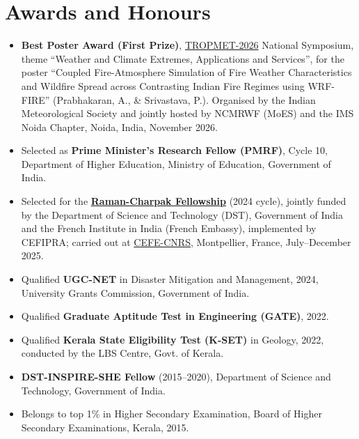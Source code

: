 \documentclass[letterpaper,11pt]{article}
\begin{document}
\section{Awards and Honours}
\begin{justify}
      \begin{itemize}[leftmargin=*,itemsep=1pt,parsep=0pt,topsep=2pt]
        \item \small \textbf{Best Poster Award (First Prize)}, \href{https://tropmet26.ncmrwf.gov.in/}{TROPMET-2026} National Symposium, theme ``Weather and Climate Extremes, Applications and Services'', for the poster ``Coupled Fire-Atmosphere Simulation of Fire Weather Characteristics and Wildfire Spread across Contrasting Indian Fire Regimes using WRF-FIRE'' (Prabhakaran, A., \& Srivastava, P.). Organised by the Indian Meteorological Society and jointly hosted by NCMRWF (MoES) and the IMS Noida Chapter, Noida, India, November 2026.
        \item \small Selected as \textbf{Prime Minister's Research Fellow (PMRF)}, Cycle 10, Department of Higher Education, Ministry of Education, Government of India.
        \item \small Selected for the \textbf{\href{https://www.inde.campusfrance.org/raman-charpak-fellowship}{Raman-Charpak Fellowship}} (2024 cycle), jointly funded by the Department of Science and Technology (DST), Government of India and the French Institute in India (French Embassy), implemented by CEFIPRA; carried out at \href{https://www.cefe.cnrs.fr/en/research-dpt/functional-ecology/forecast-en}{CEFE-CNRS}, Montpellier, France, July--December 2025.
        \item \small Qualified \textbf{UGC-NET} in Disaster Mitigation and Management, 2024, University Grants Commission, Government of India.
        \item \small Qualified \textbf{Graduate Aptitude Test in Engineering (GATE)}, 2022.
        \item \small Qualified \textbf{Kerala State Eligibility Test (K-SET)} in Geology, 2022, conducted by the LBS Centre, Govt. of Kerala.
        \item \small \textbf{DST-INSPIRE-SHE Fellow} (2015--2020), Department of Science and Technology, Government of India.
        \item \small Belongs to top 1\% in Higher Secondary Examination, Board of Higher Secondary Examinations, Kerala, 2015.
      \end{itemize}
\end{justify}
\vspace{-0.15cm}
\end{document}

